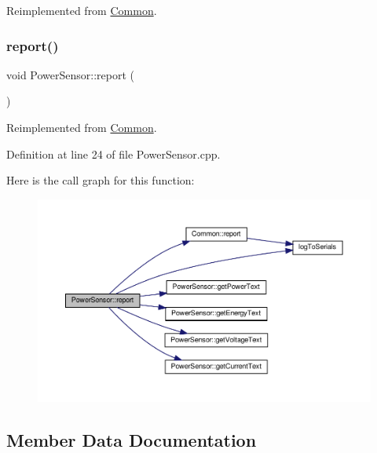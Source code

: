 Reimplemented from \hyperlink{class_common_a9e60e2c26a5f4d72342a59a969954636}{Common}.

\mbox{\label{class_power_sensor_a3cbd46c601175cfe32bb12b9205b0e10}} 
\subsubsection{\texorpdfstring{report()}{report()}\hspace{0.1cm}{\footnotesize\ttfamily [2/2]}}
{\footnotesize\ttfamily void Power\+Sensor\+::report (\begin{DoxyParamCaption}{ }\end{DoxyParamCaption})\hspace{0.3cm}{\ttfamily [virtual]}}



Reimplemented from \hyperlink{class_common_a9e60e2c26a5f4d72342a59a969954636}{Common}.



Definition at line 24 of file Power\+Sensor.\+cpp.

Here is the call graph for this function\+:
\nopagebreak
\begin{figure}[H]
\begin{center}
\leavevmode
\includegraphics[width=350pt]{class_power_sensor_a3cbd46c601175cfe32bb12b9205b0e10_cgraph}
\end{center}
\end{figure}


\subsection{Member Data Documentation}
\mbox{\label{class_power_sensor_aec7f26ccc5882e626f4dd6fa0f4729bb}} 
